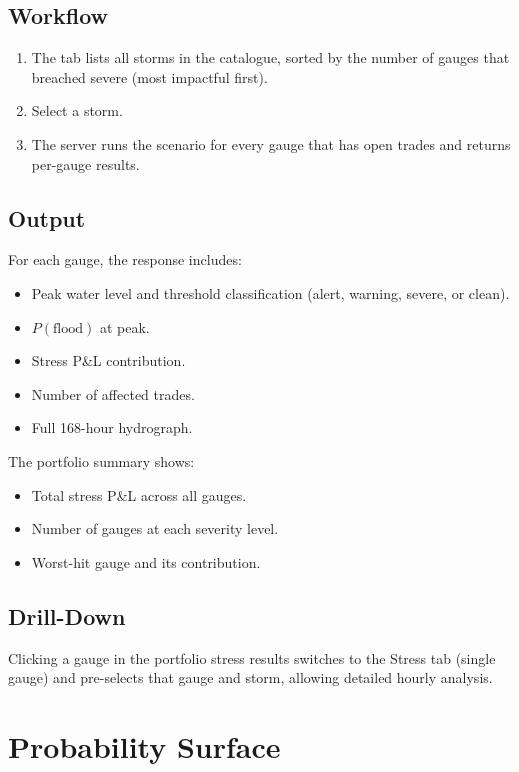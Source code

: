 \documentclass[11pt,a4paper]{article}
\begin{document}
\subsection{Workflow}

\begin{enumerate}
  \item The tab lists all storms in the catalogue, sorted by the
        number of gauges that breached severe (most impactful first).
  \item Select a storm.
  \item The server runs the scenario for every gauge that has open
        trades and returns per-gauge results.
\end{enumerate}

\subsection{Output}

For each gauge, the response includes:
\begin{itemize}
  \item Peak water level and threshold classification (alert,
        warning, severe, or clean).
  \item $P(\text{flood})$ at peak.
  \item Stress P\&L contribution.
  \item Number of affected trades.
  \item Full 168-hour hydrograph.
\end{itemize}

\noindent The portfolio summary shows:
\begin{itemize}
  \item Total stress P\&L across all gauges.
  \item Number of gauges at each severity level.
  \item Worst-hit gauge and its contribution.
\end{itemize}

\subsection{Drill-Down}

Clicking a gauge in the portfolio stress results switches to the
Stress tab (single gauge) and pre-selects that gauge and storm,
allowing detailed hourly analysis.


\section{Probability Surface}
\end{document}
